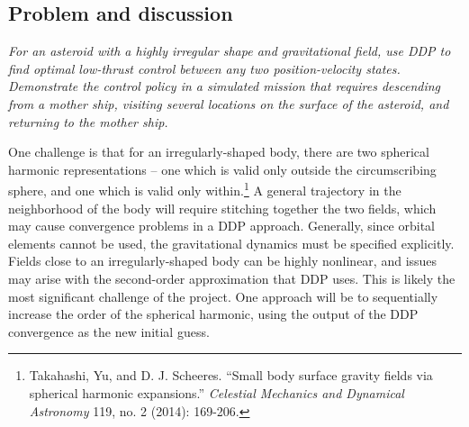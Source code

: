 \documentclass{article}
\begin{document}
\begin{multicols}{2}
\section*{Problem and discussion}
\emph{For an asteroid with a highly irregular shape and gravitational field, use DDP to find optimal low-thrust control between any two position-velocity states. Demonstrate the control policy in a simulated mission that requires descending from a mother ship, visiting several locations on the surface of the asteroid, and returning to the mother ship.}

One challenge is that for an irregularly-shaped body, there are two spherical harmonic representations -- one which is valid only outside the circumscribing sphere, and one which is valid only within.\footnote{Takahashi, Yu, and D. J. Scheeres. ``Small body surface gravity fields via spherical harmonic expansions.'' \emph{Celestial Mechanics and Dynamical Astronomy} 119, no. 2 (2014): 169-206.} A general trajectory in the neighborhood of the body will require stitching together the two fields, which may cause convergence problems in a DDP approach. Generally, since orbital elements cannot be used, the gravitational dynamics must be specified explicitly. Fields close to an irregularly-shaped body can be highly nonlinear, and issues may arise with the second-order approximation that DDP uses. This is likely the most significant challenge of the project. One approach will be to sequentially increase the order of the spherical harmonic, using the output of the DDP convergence as the new initial guess.
\end{multicols}
\end{document}
